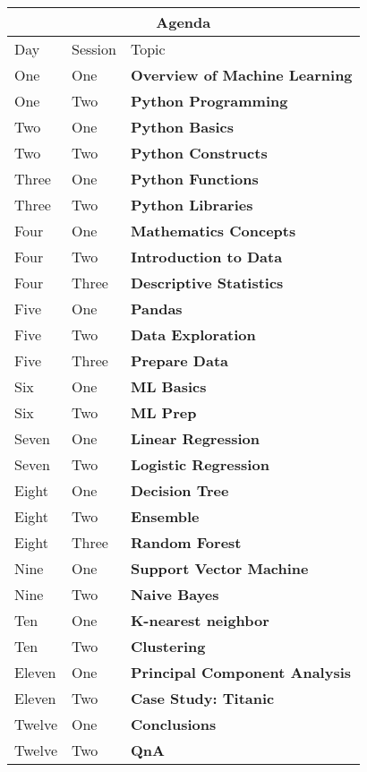 \documentclass[a4paper, 11pt]{article}
\begin{document}
\begin{center} 
\begin{tabular}{ |p{1cm}|p{1cm}||p{10cm}|}
\hline
\multicolumn{3}{|c|}{\textbf{\large Agenda}} \\
\hline
Day & Session & Topic\\
 \hline
One   	&  	One    	&  	\textbf{Overview of Machine Learning}\\
One 	&   Two  	&   \textbf{Python Programming} \\
\hline
Two   	&  	One    	& 	\textbf{Python Basics} \\
Two   	&  	Two    	& 	\textbf{Python Constructs} \\
\hline
Three   &  	One    	& 	\textbf{Python Functions} \\
Three   &  	Two    	& 	\textbf{Python Libraries} \\
\hline
Four   	&  	One    	& 	\textbf{Mathematics Concepts} \\
Four   	&  	Two    	& 	\textbf{Introduction to Data} \\
Four   	&  	Three   & 	\textbf{Descriptive Statistics} \\
\hline
Five   	&  	One    	& 	\textbf{Pandas} \\
Five   	&  	Two    	& 	\textbf{Data Exploration} \\
Five   	&  	Three   & 	\textbf{Prepare Data} \\
\hline
Six   	&  	One    	& 	\textbf{ML Basics} \\
Six   	&  	Two    	& 	\textbf{ML Prep} \\
\hline
Seven   &  	One    	& 	\textbf{Linear Regression} \\
Seven  	&  	Two    	& 	\textbf{Logistic Regression} \\
\hline
Eight   &  	One    	& 	\textbf{Decision Tree} \\
Eight  	&  	Two    	& 	\textbf{Ensemble} \\
Eight  	&  	Three   & 	\textbf{Random Forest} \\
\hline
Nine   	&  	One    	& 	\textbf{Support Vector Machine} \\
Nine  	&  	Two    	& 	\textbf{Naive Bayes} \\
\hline
Ten   	&  	One    	& 	\textbf{K-nearest neighbor} \\
Ten  	&  	Two    	& 	\textbf{Clustering} \\
\hline
Eleven 	&  	One    	& 	\textbf{Principal Component Analysis} \\
Eleven 	&  	Two    	& 	\textbf{Case Study: Titanic} \\
\hline
Twelve 	&  	One    	& 	\textbf{Conclusions} \\
Twelve 	&  	Two    	& 	\textbf{QnA} \\
\hline
\end{tabular}
\end{center}
\end{document}
